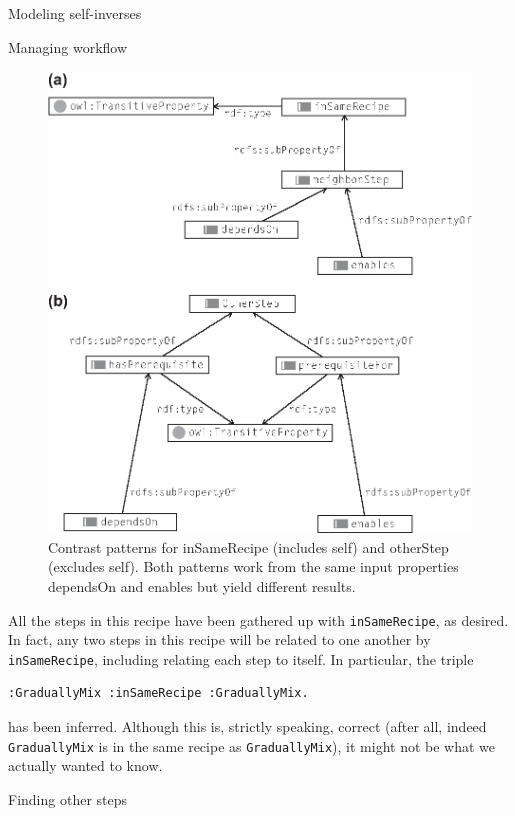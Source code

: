 \begin{challenge}{Modeling self-inverses}
\begin{challenge}{Managing workflow}
\begin{figure}
\centering
\includegraphics[width=5in]{media/ch9/f09-008.eps}
\caption{Contrast patterns for inSameRecipe (includes self) and otherStep
(excludes self). Both patterns work from the same input properties
dependsOn and enables but yield different results.}
\label{fig:ch9.8}
\end{figure}



All the steps in this recipe have been gathered up with \texttt{inSameRecipe}, as
desired. In fact, any two steps in this recipe will be related to one
another by \texttt{inSameRecipe}, including relating each step to itself. In
particular, the triple

\begin{lstlisting}
:GraduallyMix :inSameRecipe :GraduallyMix.
\end{lstlisting}

has been inferred. Although this is, strictly speaking, correct (after
all, indeed \texttt{GraduallyMix} is in the same recipe as \texttt{GraduallyMix}), it
might not be what we actually wanted to know.
\end{challenge}


\begin{challenge}{Finding other steps}


\end{challenge}
\end{challenge}
